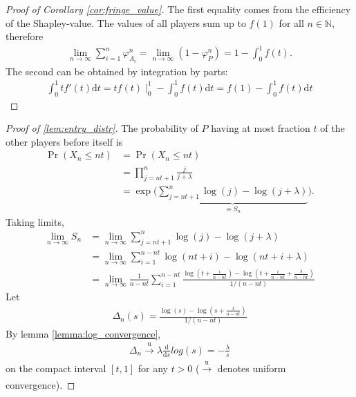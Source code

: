 \documentclass[a4paper]{article}
\newcommand{\dt}{\mathrm{d}t}
\begin{document}
\begin{proof}[Proof of Corollary \ref{cor:fringe_value}]
    The first equality comes from the efficiency of the Shapley-value.
    The values of all players sum up to $f(1)$ for all $n \in \mathbb{N}$, therefore
    \begin{align*}
        \lim_{n \to \infty} \sum_{i=1}^n \varphi_{A_i}^n = \lim_{n \to \infty} (1 - \varphi_P^n ) = 1 - \int_0^1 f(t).
    \end{align*}
    The second can be obtained by integration by parts:
    \begin{align*}
        \int_0^1 t f'(t) \dt = tf(t) \mid_0^1 - \int_0^1 f(t) \dt = f(1) - \int_0^1 f(t) \dt
    \end{align*}
\end{proof}

\begin{proof}[Proof of \cref{lem:entry_distr}] %
    The probability of $P$ having at most fraction $t$ of the other players before itself is
    \begin{align*}
        \Pr(X_n \leq nt) &= \Pr(X_n \leq nt ) \\
        &= \prod_{j = nt + 1}^n \frac{j}{j + \lambda} \\
        &= \exp \Bigg( \underbrace{\sum_{j = nt + 1}^n \log(j) - \log(j+\lambda)}_{\equiv S_n} \Bigg).
    \end{align*}
    Taking limits,
    \begin{align*}
        \lim_{n \to \infty} S_n &= \lim_{n \to \infty} \sum_{j = nt + 1}^n \log(j) - \log(j+\lambda) \\
        &= \lim_{n \to \infty} \sum_{i = 1}^{n - nt} \log(nt + i) - \log(nt + i + \lambda) \\
        &= \lim_{n \to \infty} \frac{1}{n - nt} \sum_{i = 1}^{n - nt} \frac{\log \left( t + \frac{i}{n - nt} \right) - \log \left( t + \frac{i}{n - nt} + \frac{\lambda}{n - nt} \right)}{1 / (n - nt)}
    \end{align*}
    Let
    \begin{align*}
        \Delta_n(s) = \frac{\log \left( s \right) - \log \left( s + \frac{\lambda}{n - nt} \right)}{1 / (n - nt)}
    \end{align*}
    By lemma \ref{lemma:log_convergence}, 
    \begin{align*}
        \Delta_n \xrightarrow[]{\mathrm{u}} \lambda \frac{\mathrm{d}}{\mathrm{d}s}log(s) = -\frac{\lambda}{s}
    \end{align*}
    on the compact interval $[t, 1]$ for any $t > 0$ ($\xrightarrow[]{\mathrm{u}}$ denotes uniform convergence).
    

\end{proof}
\end{document}
